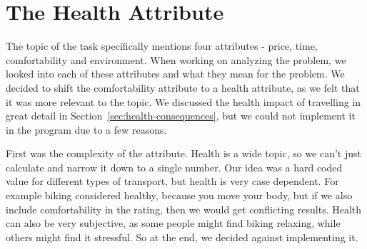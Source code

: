 \section{The Health Attribute}\label{sec:health-attribute}

The topic of the task specifically mentions four attributes - price, time, comfortability and environment.
When working on analyzing the problem, we looked into each of these attributes and what they mean for the problem.
We decided to shift the comfortability attribute to a health attribute, as we felt that it was more relevant to the
topic.
We discussed the health impact of travelling in great detail in Section~\ref{sec:health-consequences}, but we could not
implement it in the program due to a few reasons.

First was the complexity of the attribute.
Health is a wide topic, so we can't just calculate and narrow it down to a single number.
Our idea was a hard coded value for different types of transport, but health is very case dependent.
For example biking considered healthy, because you move your body, but if we also include comfortability in the rating,
then we would get conflicting results.
Health can also be very subjective, as some people might find biking relaxing, while others might find it stressful.
So at the end, we decided against implementing it.
